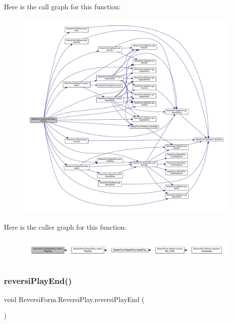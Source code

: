 Here is the call graph for this function\+:
\nopagebreak
\begin{figure}[H]
\begin{center}
\leavevmode
\includegraphics[width=350pt]{class_reversi_form_1_1_reversi_play_abec0ea86adfc0d2f960af71235eea016_cgraph}
\end{center}
\end{figure}
Here is the caller graph for this function\+:
\nopagebreak
\begin{figure}[H]
\begin{center}
\leavevmode
\includegraphics[width=350pt]{class_reversi_form_1_1_reversi_play_abec0ea86adfc0d2f960af71235eea016_icgraph}
\end{center}
\end{figure}
\mbox{\label{class_reversi_form_1_1_reversi_play_abb6d68c910c7d14ff4eaa8db745f0449}} 
\subsubsection{\texorpdfstring{reversi\+Play\+End()}{reversiPlayEnd()}}
{\footnotesize\ttfamily void Reversi\+Form.\+Reversi\+Play.\+reversi\+Play\+End (\begin{DoxyParamCaption}{ }\end{DoxyParamCaption})}



